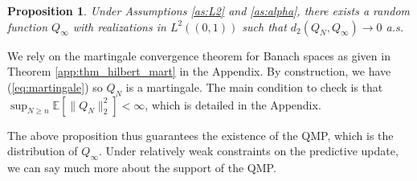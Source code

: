 \documentclass[11pt,a4paper]{article}
\newtheorem{proposition}{Proposition}%
\newenvironment{proof_outline}{\begin{proof}[Proof outline]}{\end{proof}}
\newcommand{\E}{\mathbb{E}}
\begin{document}
\begin{proposition}\label{prop:L2_mart}
   Under {Assumptions \ref{as:L2}} and {\ref{as:alpha}}, there exists a random function $Q_\infty$ with realizations in $L^2((0,1))$   such that 
    $d_2(Q_N,Q_\infty) \to 0$ a.s. 
    
\end{proposition}
\begin{proof_outline}
    We rely on the martingale convergence theorem for Banach spaces as given in {Theorem \ref{app:thm_hilbert_mart}} in the Appendix. By construction, we have (\ref{eq:martingale}) so $Q_N$ is a martingale. The main condition to check is that $\sup_{N \geq n}\E\left[\|Q_N\|_{2}^2\right] < \infty$, which is detailed in the Appendix.
\end{proof_outline}
The above proposition thus guarantees the existence of the QMP, which is the distribution of $Q_\infty$. Under relatively weak constraints on the predictive update, we can say much more about the support of the QMP.
\end{document}
